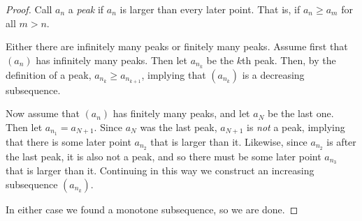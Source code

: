 \begin{proofidea}
\begin{tightfigure}
  \end{tightfigure}
\end{proofidea}

\begin{proof}
  Call $a_n$ a \textit{peak} if $a_n$ is larger than every later
  point. That is, if $a_n \geq a_m$ for all $m > n$.

  Either there are infinitely many peaks or finitely many peaks.
  Assume first that $(a_n)$ has infinitely many peaks. Then let
  $a_{n_k}$ be the $k$th peak. Then, by the definition of a peak,
  $a_{n_k} \geq a_{n_{k+1}}$, implying that $(a_{n_k})$ is a
  decreasing subsequence.

  Now assume that $(a_n)$ has finitely many peaks, and let $a_N$ be
  the last one. Then let $a_{n_1} = a_{N+1}$. Since $a_N$ was the
  last peak, $a_{N+1}$ is \textit{not} a
  peak, implying that there is some later point $a_{n_2}$ that is
  larger than it. Likewise, since $a_{n_2}$ is after the last peak,
  it is also not a peak, and so there must be some later point
  $a_{n_3}$ that is larger than it. Continuing in this way we
  construct an increasing subsequence $(a_{n_k})$.

  In either case we found a monotone subsequence, so we are done.
\end{proof}


